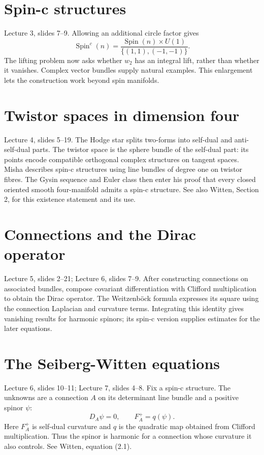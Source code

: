 \section{Spin-c structures}
\label{section-spin-c}

\noindent
Lecture 3, slides 7--9.
Allowing an additional circle factor gives
$$
\operatorname{Spin}^c(n)
=\frac{\operatorname{Spin}(n)\times U(1)}
{\{(1,1),(-1,-1)\}}.
$$
The lifting problem now asks whether
$w_2$ has an integral lift, rather than
whether it vanishes. Complex vector
bundles supply natural examples.
This enlargement lets the construction
work beyond spin manifolds.

\section{Twistor spaces in dimension four}
\label{section-twistors}

\noindent
Lecture 4, slides 5--19.
The Hodge star splits two-forms into
self-dual and anti-self-dual parts.
The twistor space is the sphere bundle
of the self-dual part: its points encode
compatible orthogonal complex structures
on tangent spaces.
Misha describes spin-c structures using
line bundles of degree one on twistor
fibres. The Gysin sequence and Euler
class then enter his proof that every
closed oriented smooth four-manifold
admits a spin-c structure.
See also Witten, Section 2, for this
existence statement and its use.

\section{Connections and the Dirac operator}
\label{section-dirac}

\noindent
Lecture 5, slides 2--21;
Lecture 6, slides 7--9.
After constructing connections on
associated bundles, compose covariant
differentiation with Clifford
multiplication to obtain the Dirac
operator. The Weitzenb\"ock formula
expresses its square using the connection
Laplacian and curvature terms.
Integrating this identity gives vanishing
results for harmonic spinors; its
spin-c version supplies estimates for
the later equations.

\section{The Seiberg-Witten equations}
\label{section-equations}

\noindent
Lecture 6, slides 10--11;
Lecture 7, slides 4--8.
Fix a spin-c structure. The unknowns are
a connection $A$ on its determinant line
bundle and a positive spinor $\psi$:
$$
D_A\psi=0,\qquad F_A^+=q(\psi).
$$
Here $F_A^+$ is self-dual curvature and
$q$ is the quadratic map obtained from
Clifford multiplication.
Thus the spinor is harmonic for a
connection whose curvature it also
controls. See Witten, equation (2.1).

